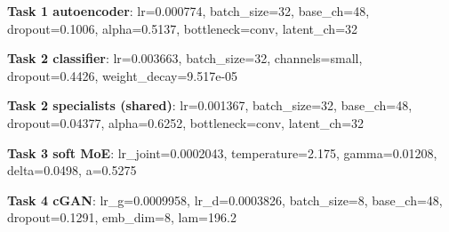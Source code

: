 \item \textbf{Task 1 autoencoder}: lr=0.000774, batch\_size=32, base\_ch=48, dropout=0.1006, alpha=0.5137, bottleneck=conv, latent\_ch=32
\item \textbf{Task 2 classifier}: lr=0.003663, batch\_size=32, channels=small, dropout=0.4426, weight\_decay=9.517e-05
\item \textbf{Task 2 specialists (shared)}: lr=0.001367, batch\_size=32, base\_ch=48, dropout=0.04377, alpha=0.6252, bottleneck=conv, latent\_ch=32
\item \textbf{Task 3 soft MoE}: lr\_joint=0.0002043, temperature=2.175, gamma=0.01208, delta=0.0498, a=0.5275
\item \textbf{Task 4 cGAN}: lr\_g=0.0009958, lr\_d=0.0003826, batch\_size=8, base\_ch=48, dropout=0.1291, emb\_dim=8, lam=196.2
